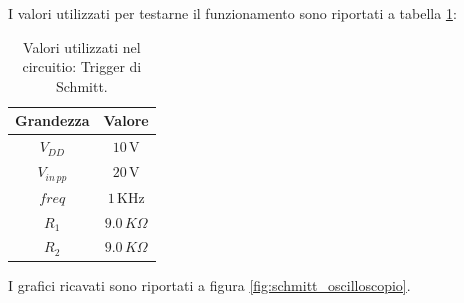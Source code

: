 \documentclass[a4paper,12pt]{article}
\begin{document}
\noindent I valori utilizzati per testarne il funzionamento sono riportati a tabella \ref{tab:valori_trigger_schmitt}:
\begin{table}[h]
	\centering
	\setlength{\tabcolsep}{20pt}
	\begin{tabular}{c c}
		\toprule
		\textbf{Grandezza}     & \textbf{Valore}            \\
		\midrule
		$V_{DD}$     & $10\,\mathrm{V}$  \\
		$V_{in\,pp}$ & $20\,\mathrm{V}$  \\
		$freq$       & $1\,\mathrm{KHz}$ \\
		$R_1$        & $9.0\,K\Omega$    \\
		$R_2$        & $9.0\,K\Omega$    \\
		\bottomrule
	\end{tabular}
	\caption{Valori utilizzati nel circuitio: Trigger di Schmitt.}
	\label{tab:valori_trigger_schmitt}
\end{table}

\noindent I grafici ricavati sono riportati a figura \ref{fig:schmitt_oscilloscopio}.
\end{document}

